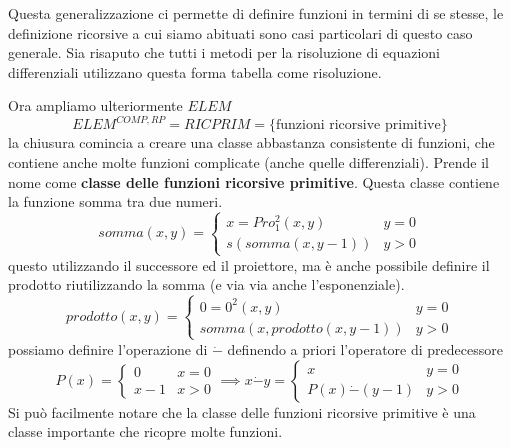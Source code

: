 \documentclass{article}
\begin{document}
Questa generalizzazione ci permette di definire funzioni in termini di se stesse, le
definizione ricorsive a cui siamo abituati sono casi particolari di questo caso generale. Sia
risaputo che tutti i metodi per la risoluzione di equazioni differenziali utilizzano
questa forma tabella come risoluzione.

Ora ampliamo ulteriormente $ELEM$
$$ELEM^{COMP,RP}=RICPRIM=\{\text{funzioni ricorsive primitive}\}$$
la chiusura comincia a creare una classe abbastanza consistente di funzioni, che contiene
anche molte funzioni complicate (anche quelle differenziali). Prende il nome come
\textbf{classe delle funzioni ricorsive primitive}. Questa classe contiene la funzione
somma tra due numeri.
\[
    somma(x,y)=
    \begin{cases}
        x=Pro^2_1(x,y)  & y=0 \\
        s(somma(x,y-1)) & y>0
    \end{cases}
\]
questo utilizzando il successore ed il proiettore, ma è anche possibile definire il prodotto
riutilizzando la somma (e via via anche l'esponenziale).
\[
    prodotto(x,y)=
    \begin{cases}
        0=0^2(x,y)                & y=0 \\
        somma(x, prodotto(x,y-1)) & y>0
    \end{cases}
\]
possiamo definire l'operazione di $\dot{-}$ definendo a priori l'operatore di predecessore
\[
    P(x)=
    \begin{cases}
        0   & x=0 \\
        x-1 & x>0
    \end{cases}
    \implies
    x\dot{-}y=
    \begin{cases}
        x                & y=0 \\
        P(x)\dot{-}(y-1) & y>0
    \end{cases}
\]
Si può facilmente notare che la classe delle funzioni ricorsive primitive è una classe
importante che ricopre molte funzioni.
\end{document}
